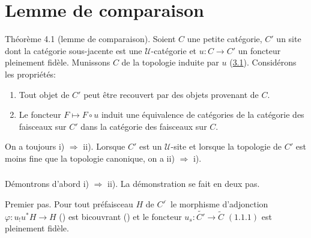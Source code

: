 \section{Lemme de comparaison}\pageoriginale

\begin{enonce*}{Théorème 4.1}
{\rm(lemme de comparaison)}. Soient $C$ une petite catégorie,
$C'$ un site dont la catégorie sous-jacente est une
$𝒰$-catégorie et $u:C\rightarrow C'$ un foncteur
pleinement fidèle. Munissons $C$ de la topologie induite par $u$
{\rm(\hyperref[III.subsec3.1]{3.1}).} Considérons les propriétés:
\begin{enumerate}
\renewcommand{\theenumi}{\roman{enumi}}
\renewcommand{\labelenumi}{\theenumi)}
\item Tout objet de $C'$ peut être recouvert par des objets
provenant de $C$.

\item Le foncteur $F\mapsto F\circ u$ induit une équivalence de
catégories de la catégorie des faisceaux sur $C'$ dans la
catégorie des faisceaux sur $C$.
\end{enumerate}

On a toujours {\rm i) $\Rightarrow$ ii).} Lorsque $C'$ est un
$𝒰$-site et lorsque la topologie de $C'$ est moins fine que
la topologie canonique, on a {\rm ii) $\Rightarrow$ i).}
\end{enonce*}

\setcounter{subsection}{1}
\subsubsection{}
Démontrons d'abord i) $\Rightarrow$ ii). La démonstration se
fait en deux pas.

Premier pas. Pour tout préfaisceau $H$ de
${C'}^{\widehat{\phantom{,}}}$ le morphisme d'adjonction
$\varphi:u_{!}u^{\ast}H\rightarrow H$ {\rm()} est
bicouvrant {\rm()} et le foncteur
$u_s:\widetilde{C'}\rightarrow \widetilde{C}$ $(1.1.1)$ est
pleinement fidèle.


